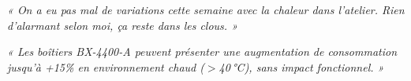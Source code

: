 \documentclass[11pt]{article}
\begin{document}
\lhElecarm
{}

\begin{quotebox}
\itshape « On a eu pas mal de variations cette semaine avec la chaleur dans l'atelier. Rien d'alarmant selon moi, ça reste dans les clous. »
\end{quotebox}

\vspace{8pt}
\begin{quotebox}
\itshape « Les boîtiers BX-4400-A peuvent présenter une augmentation de consommation jusqu'à +15\% en environnement chaud ($>$40\,°C), sans impact fonctionnel. »
\end{quotebox}
\docfooter
\end{document}
